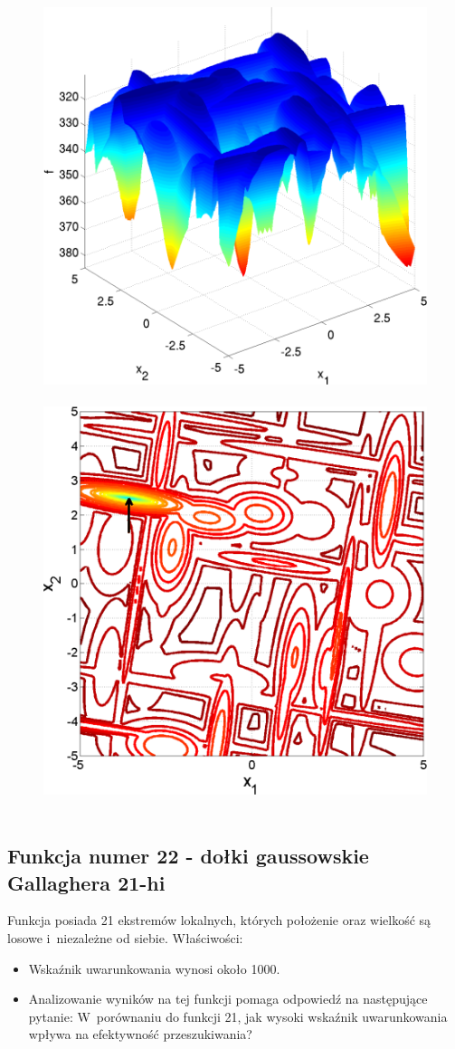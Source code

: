 \documentclass[a4paper,onecolumn,oneside,11pt,wide,floatssmall]{mwrep}
\theoremstyle{definition}
\theoremstyle{plain}%
\theoremstyle{remark}
\begin{document}
\begin{figure}[H]
\centering
\mbox{
\includegraphics[width=.45\textwidth]{img/21.png} \quad
\includegraphics[width=.45\textwidth]{img/21a.png} 
}
\end{figure}

\subsection{Funkcja numer 22 - dołki gaussowskie Gallaghera 21-hi}

Funkcja posiada 21 ekstremów lokalnych, których położenie oraz wielkość są losowe i~niezależne od siebie.
Właściwości:
\begin{itemize}
 \item Wskaźnik uwarunkowania wynosi około 1000.
 \item Analizowanie wyników na tej funkcji pomaga odpowiedź na następujące pytanie: W~porównaniu do funkcji 21, jak 
wysoki wskaźnik uwarunkowania wpływa na efektywność przeszukiwania?
\end{itemize} 
\end{document}
